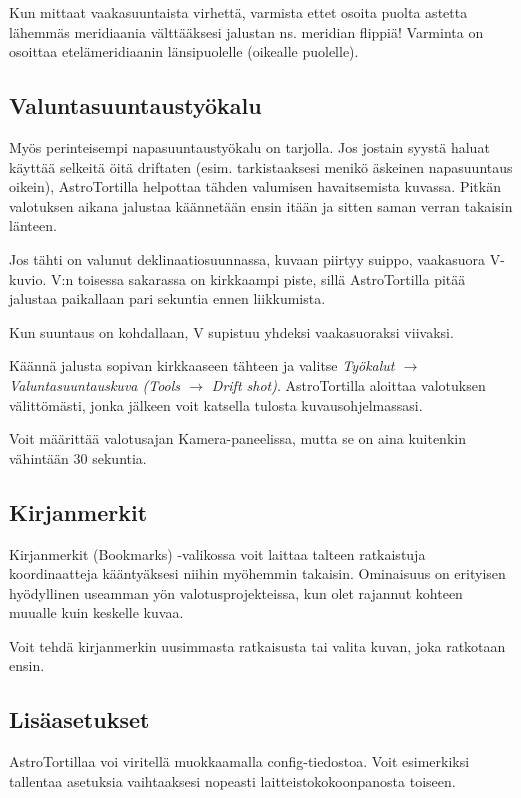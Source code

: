\documentclass{article}
\begin{document}
Kun mittaat vaakasuuntaista virhettä, varmista ettet osoita puolta astetta
lähemmäs meridiaania välttääksesi jalustan ns. meridian flippiä! Varminta on
osoittaa etelämeridiaanin länsipuolelle (oikealle puolelle).



\subsection{Valuntasuuntaustyökalu}

Myös perinteisempi napasuuntaustyökalu on tarjolla. Jos jostain syystä haluat 
käyttää selkeitä öitä driftaten (esim. tarkistaaksesi menikö äskeinen napasuuntaus oikein),
AstroTortilla helpottaa tähden valumisen havaitsemista kuvassa. Pitkän valotuksen aikana jalustaa käännetään ensin itään ja sitten saman verran takaisin länteen.

Jos tähti on valunut deklinaatiosuunnassa, kuvaan piirtyy suippo,
vaakasuora V-kuvio. V:n toisessa sakarassa on kirkkaampi piste, 
sillä AstroTortilla pitää jalustaa paikallaan pari sekuntia ennen liikkumista.

Kun suuntaus on kohdallaan, V supistuu yhdeksi vaakasuoraksi viivaksi.

Käännä jalusta sopivan kirkkaaseen tähteen ja valitse
\emph{Työkalut $\rightarrow$
Valuntasuuntauskuva (Tools $\rightarrow$ Drift shot)}. AstroTortilla aloittaa valotuksen välittömästi, jonka jälkeen voit katsella tulosta
kuvausohjelmassasi.

Voit määrittää valotusajan Kamera-paneelissa, mutta se on aina kuitenkin vähintään 30 sekuntia.

\subsection{Kirjanmerkit}

Kirjanmerkit (Bookmarks) -valikossa voit laittaa talteen ratkaistuja koordinaatteja kääntyäksesi niihin myöhemmin takaisin.
Ominaisuus on erityisen hyödyllinen useamman yön valotusprojekteissa, kun olet rajannut kohteen muualle kuin keskelle kuvaa.

Voit tehdä kirjanmerkin uusimmasta ratkaisusta tai valita kuvan, joka ratkotaan ensin.

\subsection{Lisäasetukset}

AstroTortillaa voi viritellä muokkaamalla config-tiedostoa. Voit esimerkiksi tallentaa asetuksia vaihtaaksesi nopeasti laitteistokokoonpanosta toiseen.
\end{document}
